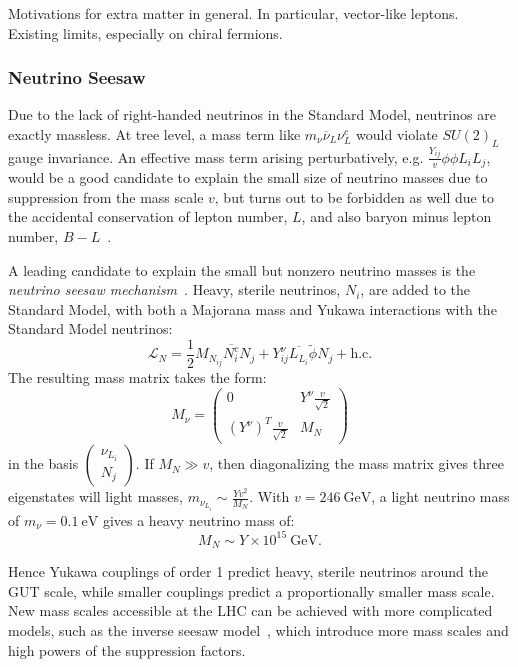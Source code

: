Motivations for extra matter in general.  In particular, vector-like leptons. Existing limits, especially on chiral fermions.



\subsubsection{Neutrino Seesaw}
Due to the lack of right-handed neutrinos in the Standard Model, neutrinos are exactly massless. At tree level, a mass term like $m_{\nu} \overline{\nu}_L \nu_L^c$ would violate $SU(2)_L$ gauge invariance. An effective mass term arising perturbatively, e.g. $\frac{Y_{ij}}{v}\phi\phi L_i L_j$, would be a good candidate to explain the small size of neutrino masses due to suppression from the mass scale $v$, but turns out to be forbidden as well due to the accidental conservation of lepton number, $L$, and also baryon minus lepton number, $B-L$~\cite{RevModPhys.75.345}. 

A leading candidate to explain the small but nonzero neutrino masses is the \emph{neutrino seesaw mechanism}~\cite{gellmann, ramond, yanagida, RevModPhys.75.345}. Heavy, sterile neutrinos, $N_i$, are added to the Standard Model, with both a Majorana mass and Yukawa interactions with the Standard Model neutrinos:
\begin{equation}
	\mathcal{L}_N = \frac12 M_{N_{ij}} \overline{N^c_i} N_j + Y_{ij}^{\nu} \overline{L_{L_i}} \tilde{\phi} N_{j} + \mathrm{h.c.}
\end{equation}
The resulting mass matrix takes the form:
\begin{equation}
	M_{\nu} = \left(\begin{array}{cc} 0 & Y^{\nu} \frac{v}{\sqrt{2}} \\ (Y^{\nu})^T \frac{v}{\sqrt{2}} & M_N \end{array}\right)
\end{equation}
in the basis $\left(\begin{array}{c} \nu_{L_i} \\ N_j \end{array} \right)$. If $M_N \gg v$, then diagonalizing the mass matrix gives three eigenstates will light masses, $m_{\nu_{L_i}} \sim  \frac{Yv^2}{M_N}$. With $v=246~\mbox{GeV}$, a light neutrino mass of $m_{\nu}=0.1~\mbox{eV}$ gives a heavy neutrino mass of:
\begin{equation}
	M_N \sim Y \times 10^{15}~\mbox{GeV}.
\end{equation}

Hence Yukawa couplings of order 1 predict heavy, sterile neutrinos around the GUT scale, while smaller couplings predict a proportionally smaller mass scale. New mass scales accessible at the LHC can be achieved with more complicated models, such as the inverse seesaw model~\cite{inverse seesaw}, which introduce more mass scales and high powers of the suppression factors.

